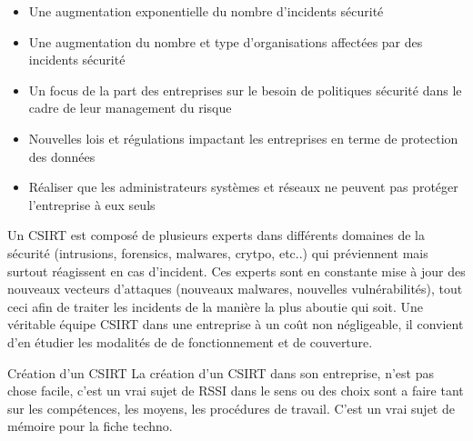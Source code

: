 \begin{itemize}
  \item Une augmentation exponentielle du nombre d’incidents sécurité
  \item Une augmentation du nombre et type d’organisations affectées par des incidents sécurité
  \item Un focus de la part des entreprises sur le besoin de politiques sécurité dans le cadre de leur management du risque
  \item Nouvelles lois et régulations impactant les entreprises en terme de protection des données
  \item Réaliser que les administrateurs systèmes et réseaux ne peuvent pas protéger l’entreprise à eux seuls
\end{itemize}

Un CSIRT est composé de plusieurs experts dans différents domaines de la sécurité (intrusions, forensics, malwares, crytpo, etc..) qui préviennent mais surtout réagissent en cas d’incident. Ces experts sont en constante mise à jour des nouveaux vecteurs d’attaques (nouveaux malwares, nouvelles vulnérabilités), tout ceci afin de traiter les incidents de la manière la plus aboutie qui soit. Une véritable équipe CSIRT dans une entreprise à un coût non négligeable, il convient d'en étudier les modalités de de fonctionnement et de couverture.


\begin{notebox}{Création d'un CSIRT}
La création d'un CSIRT dans son entreprise, n'est pas chose facile, c'est un vrai sujet de RSSI dans le sens ou des choix sont a faire tant sur les compétences, les moyens, les procédures de travail. C'est un vrai sujet de mémoire pour la fiche techno.
\end{notebox}
